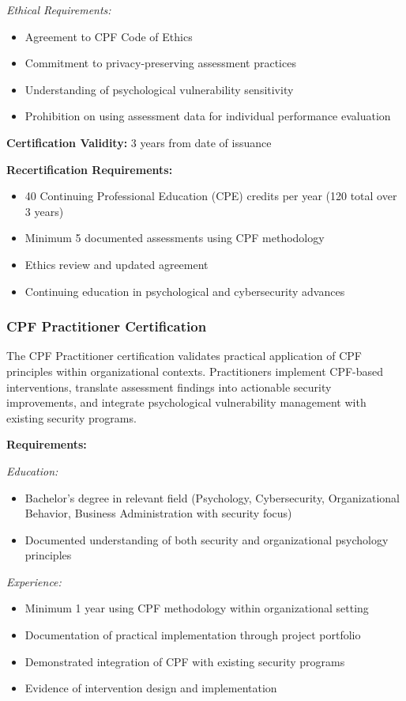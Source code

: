 \documentclass[11pt,a4paper]{article}
\begin{document}
\textit{Ethical Requirements:}
\begin{itemize}
\item Agreement to CPF Code of Ethics
\item Commitment to privacy-preserving assessment practices
\item Understanding of psychological vulnerability sensitivity
\item Prohibition on using assessment data for individual performance evaluation
\end{itemize}

\textbf{Certification Validity:} 3 years from date of issuance

\textbf{Recertification Requirements:}
\begin{itemize}
\item 40 Continuing Professional Education (CPE) credits per year (120 total over 3 years)
\item Minimum 5 documented assessments using CPF methodology
\item Ethics review and updated agreement
\item Continuing education in psychological and cybersecurity advances
\end{itemize}

\subsubsection{CPF Practitioner Certification}

The CPF Practitioner certification validates practical application of CPF principles within organizational contexts. Practitioners implement CPF-based interventions, translate assessment findings into actionable security improvements, and integrate psychological vulnerability management with existing security programs.

\textbf{Requirements:}

\textit{Education:}
\begin{itemize}
\item Bachelor's degree in relevant field (Psychology, Cybersecurity, Organizational Behavior, Business Administration with security focus)
\item Documented understanding of both security and organizational psychology principles
\end{itemize}

\textit{Experience:}
\begin{itemize}
\item Minimum 1 year using CPF methodology within organizational setting
\item Documentation of practical implementation through project portfolio
\item Demonstrated integration of CPF with existing security programs
\item Evidence of intervention design and implementation
\end{itemize}
\end{document}
